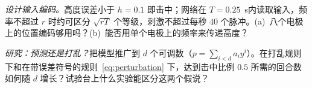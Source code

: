 \begin{exercise}[\lvlB]
\label{ex:22:6}
\emph{设计输入编码。}高度误差小于 $h=0.1$ 即击中；网络在 $T=0.25$~s内读取输入，频率不超过 $r$ 时约可区分 $\sqrt{rT}$ 个等级，刺激不超过每秒 $40$ 个脉冲。(a)~八个电极上的位置编码够用吗？(b)~能否用单个电极上的频率来传递高度？
\end{exercise}

\begin{exercise}[\lvlC]
\label{ex:22:7}
\emph{研究：预测还是打乱？}把模型推广到 $d$ 个可调数（$p=\sum_{i<d}a_iy^i$）。在打乱规则下和在带误差符号的规则~\eqref{eq:perturbation} 下，达到击中比例 $0.5$ 所需的回合数如何随 $d$ 增长？试验台上什么实验能区分这两个假说？
\end{exercise}
